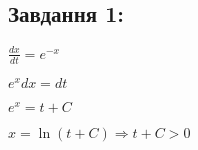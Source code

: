 \subsection{Завдання 1:}


$\frac{dx}{dt} = e^{-x}$

$e^x dx = dt$

$e^x = t + C$

$x = \ln(t+C) \Longrightarrow t + C  > 0$